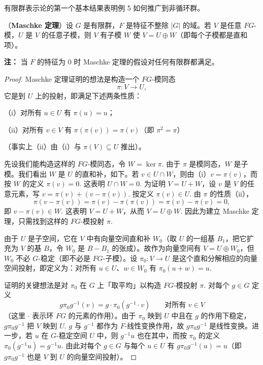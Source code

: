 有限群表示论的第一个基本结果表明例 5 如何推广到非循环群。

\begin{theorem}\label{thm:18.1}
（\textbf{Maschke 定理}）设 \(G\) 是有限群，\(F\) 是特征不整除 \(|G|\) 的域。若 \(V\) 是任意 \(FG\)-模，\(U\) 是 \(V\) 的任意子模，则 \(V\) 有子模 \(W\) 使 \(V = U \oplus W\)（即每个子模都是直和项）。
\end{theorem}

\noindent\textbf{注：} 当 \(F\) 的特征为 0 时 Maschke 定理的假设对任何有限群都满足。

\begin{proof}
Maschke 定理证明的想法是构造一个 \(FG\)-模同态
\[
\pi : V \to U,
\]
它是到 \(U\) 上的投射，即满足下述两条性质：

（i）对所有 \(u \in U\) 有 \(\pi(u) = u\)；

（ii）对所有 \(v \in V\) 有 \(\pi(\pi(v)) = \pi(v)\)（即 \(\pi^2 = \pi\)）

（事实上（ii）由（i）与 \(\pi(V) \subseteq U\) 推出）。

先设我们能构造这样的 \(FG\)-模同态，令 \(W = \ker\pi\). 由于 \(\pi\) 是模同态，\(W\) 是子模。我们看出 \(W\) 是 \(U\) 的直和补，如下。若 \(v \in U \cap W\)，则由（i）\(v = \pi(v)\)，而按 \(W\) 的定义 \(\pi(v) = 0\). 这表明 \(U \cap W = 0\). 为证明 \(V = U+W\)，设 \(v\) 是 \(V\) 的任意元素，写 \(v = \pi(v)+(v-\pi(v))\). 按定义 \(\pi(v) \in U\). 由 \(\pi\) 的性质（ii），
\[
\pi(v-\pi(v)) = \pi(v)-\pi(\pi(v)) = \pi(v)-\pi(v) = 0,
\]
即 \(v-\pi(v) \in W\). 这表明 \(V = U+W\)，从而 \(V = U \oplus W\). 因此为建立 Maschke 定理，只需找到这样的 \(FG\)-模投射 \(\pi\).

由于 \(U\) 是子空间，它在 \(V\) 中有向量空间直和补 \(W_0\)（取 \(U\) 的一组基 \(B_1\)，把它扩充为 \(V\) 的基 \(B\)，令 \(W_0\) 是 \(B-B_1\) 的张成）。故作为向量空间有 \(V = U \oplus W_0\)，但 \(W_0\) 不必 \(G\)-稳定（即不必是 \(FG\)-子模）。设 \(\pi_0 : V \to U\) 是这个直和分解相应的向量空间投射，即定义为：对所有 \(u \in U\)、\(w \in W_0\) 有 \(\pi_0(u+w) = u\).

证明的关键想法是对 \(\pi_0\) 在 \(G\) 上「取平均」以构造 \(FG\)-模投射 \(\pi\). 对每个 \(g \in G\) 定义
\[
g\pi_0g^{-1}(v) = g \cdot \pi_0(g^{-1} \cdot v) \qquad \text{对所有 } v \in V
\]
（这里 \(\cdot\) 表示环 \(FG\) 的元素的作用）。由于 \(\pi_0\) 映到 \(U\) 中且在 \(g\) 的作用下稳定，\(g\pi_0g^{-1}\) 把 \(V\) 映到 \(U\). \(g\) 与 \(g^{-1}\) 都作为 \(F\)-线性变换作用，故 \(g\pi_0g^{-1}\) 是线性变换。进一步，若 \(u\) 在 \(G\)-稳定空间 \(U\) 中，则 \(g^{-1}u\) 也在其中，而按 \(\pi_0\) 的定义 \(\pi_0(g^{-1}u) = g^{-1}u\). 由此对每个 \(g \in G\) 与每个 \(u \in U\) 有 \(g\pi_0g^{-1}(u) = u\)（即 \(g\pi_0g^{-1}\) 也是 \(V\) 到 \(U\) 的向量空间投射）。


\end{proof}
